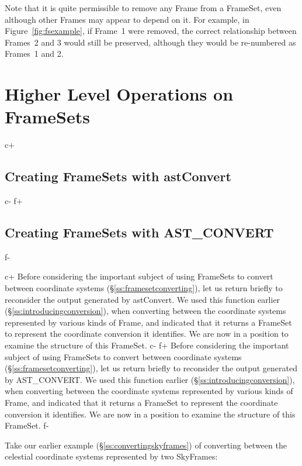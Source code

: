 \documentclass[twoside,11pt]{article}
\newcommand{\secref}[1]{\S\ref{#1}}
\newcommand{\secref}[1]{\ref{#1}}
\begin{document}
Note that it is quite permissible to remove any Frame from a FrameSet,
even although other Frames may appear to depend on it. For example, in
Figure~\ref{fig:fsexample}, if Frame~1 were removed, the correct
relationship between Frames~2 and 3 would still be preserved, although
they would be re-numbered as Frames~1 and 2.

\cleardoublepage
\section{\label{ss:fshigher}Higher Level Operations on FrameSets}

c+
\subsection{\label{ss:framesetsfromconvert}Creating FrameSets with astConvert}
c-
f+
\subsection{\label{ss:framesetsfromconvert}Creating FrameSets with AST\_CONVERT}
f-

c+
Before considering the important subject of using FrameSets to convert
between coordinate systems (\secref{ss:framesetconverting}), let us
return briefly to reconsider the output generated by astConvert. We
used this function earlier (\secref{ss:introducingconversion}), when
converting between the coordinate systems represented by various kinds
of Frame, and indicated that it returns a FrameSet to represent the
coordinate conversion it identifies. We are now in a position to
examine the structure of this FrameSet.
c-
f+
Before considering the important subject of using FrameSets to convert
between coordinate systems (\secref{ss:framesetconverting}), let us
return briefly to reconsider the output generated by AST\_CONVERT. We
used this function earlier (\secref{ss:introducingconversion}), when
converting between the coordinate systems represented by various kinds
of Frame, and indicated that it returns a FrameSet to represent the
coordinate conversion it identifies. We are now in a position to
examine the structure of this FrameSet.
f-

Take our earlier example (\secref{ss:convertingskyframes}) of
converting between the celestial coordinate systems represented by two
SkyFrames:
\end{document}
